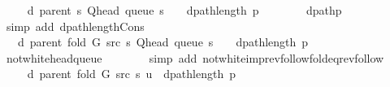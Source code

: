 \begin{isabellebody}
\ \isamarkupfalse%
\ {\isachardoublequoteopen}{\isachardot}{\kern0pt}{\isachardot}{\kern0pt}{\isachardot}{\kern0pt}\ {\isacharequal}{\kern0pt}\ d\ {\isacharparenleft}{\kern0pt}parent\ s{\isacharparenright}{\kern0pt}\ {\isacharparenleft}{\kern0pt}Q{\isacharunderscore}{\kern0pt}head\ {\isacharparenleft}{\kern0pt}queue\ s{\isacharparenright}{\kern0pt}{\isacharparenright}{\kern0pt}\ {\isacharplus}{\kern0pt}\ {}\ {\isacharplus}{\kern0pt}\ dpath{\isacharunderscore}{\kern0pt}length\ p{\isachardoublequoteclose}\isanewline
\ \ \ \ \ \ \isamarkupfalse%
\ dpath{\isacharunderscore}{\kern0pt}p\isanewline
\ \ \ \ \ \ \isamarkupfalse%
\ {\isacharparenleft}{\kern0pt}simp\ add{\isacharcolon}{\kern0pt}\ dpath{\isacharunderscore}{\kern0pt}length{\isacharunderscore}{\kern0pt}Cons{\isacharparenright}{\kern0pt}\isanewline
\ \ \ \ \isamarkupfalse%
\ \isamarkupfalse%
\ {\isachardoublequoteopen}{\isachardot}{\kern0pt}{\isachardot}{\kern0pt}{\isachardot}{\kern0pt}\ {\isacharequal}{\kern0pt}\ d\ {\isacharparenleft}{\kern0pt}parent\ {\isacharparenleft}{\kern0pt}fold\ G\ src\ s{\isacharparenright}{\kern0pt}{\isacharparenright}{\kern0pt}\ {\isacharparenleft}{\kern0pt}Q{\isacharunderscore}{\kern0pt}head\ {\isacharparenleft}{\kern0pt}queue\ s{\isacharparenright}{\kern0pt}{\isacharparenright}{\kern0pt}\ {\isacharplus}{\kern0pt}\ {}\ {\isacharplus}{\kern0pt}\ dpath{\isacharunderscore}{\kern0pt}length\ p{\isachardoublequoteclose}\isanewline
\ \ \ \ \ \ \isamarkupfalse%
\ not{\isacharunderscore}{\kern0pt}white{\isacharunderscore}{\kern0pt}head{\isacharunderscore}{\kern0pt}queue\isanewline
\ \ \ \ \ \ \isamarkupfalse%
\ {\isacharparenleft}{\kern0pt}simp\ add{\isacharcolon}{\kern0pt}\ not{\isacharunderscore}{\kern0pt}white{\isacharunderscore}{\kern0pt}imp{\isacharunderscore}{\kern0pt}rev{\isacharunderscore}{\kern0pt}follow{\isacharunderscore}{\kern0pt}fold{\isacharunderscore}{\kern0pt}eq{\isacharunderscore}{\kern0pt}rev{\isacharunderscore}{\kern0pt}follow{\isacharparenright}{\kern0pt}\isanewline
\ \ \ \ \isamarkupfalse%
\ \isamarkupfalse%
\ {\isachardoublequoteopen}{\isachardot}{\kern0pt}{\isachardot}{\kern0pt}{\isachardot}{\kern0pt}\ {\isacharequal}{\kern0pt}\ d\ {\isacharparenleft}{\kern0pt}parent\ {\isacharparenleft}{\kern0pt}fold\ G\ src\ s{\isacharparenright}{\kern0pt}{\isacharparenright}{\kern0pt}\ u\ {\isacharplus}{\kern0pt}\ dpath{\isacharunderscore}{\kern0pt}length\ p{\isachardoublequoteclose}\isanewline
\ \ \ \ \ \ \isamarkupfalse%

\end{isabellebody}
